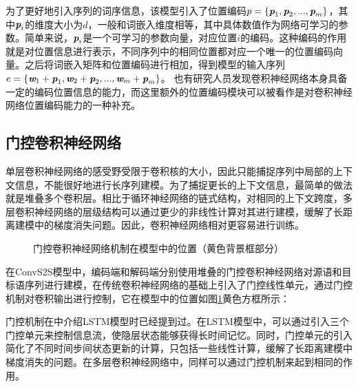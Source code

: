 \parinterval 为了更好地引入序列的词序信息，该模型引入了位置编码${p}=\{\textbf{\em p}_1,\textbf{\em p}_2,...,\textbf{\em p}_m\}$，其中$\textbf{\em p}_i$的维度大小为$d$，一般和词嵌入维度相等，其中具体数值作为网络可学习的参数。简单来说，$\textbf{\em p}_i$是一个可学习的参数向量，对应位置$i$的编码。这种编码的作用就是对位置信息进行表示，不同序列中的相同位置都对应一个唯一的位置编码向量。之后将词嵌入矩阵和位置编码进行相加，得到模型的输入序列${e}=\{\textbf{\em w}_1+\textbf{\em p}_1,\textbf{\em w}_2+\textbf{\em p}_2,...,\textbf{\em w}_m+\textbf{\em p}_m\}$。 也有研究人员发现卷积神经网络本身具备一定的编码位置信息的能力，而这里额外的位置编码模块可以被看作是对卷积神经网络位置编码能力的一种补充。


\subsection{门控卷积神经网络}

\parinterval 单层卷积神经网络的感受野受限于卷积核的大小，因此只能捕捉序列中局部的上下文信息，不能很好地进行长序列建模。为了捕捉更长的上下文信息，最简单的做法就是堆叠多个卷积层。相比于循环神经网络的链式结构，对相同的上下文跨度，多层卷积神经网络的层级结构可以通过更少的非线性计算对其进行建模，缓解了长距离建模中的梯度消失问题。因此，卷积神经网络相对更容易进行训练。

\begin{figure}[htp]
\centering

\caption{门控卷积神经网络机制在模型中的位置（黄色背景框部分）}
\label{fig:11-13}
\end{figure}

\parinterval 在ConvS2S模型中，编码端和解码端分别使用堆叠的门控卷积神经网络对源语和目标语序列进行建模，在传统卷积神经网络的基础上引入了门控线性单元，通过门控机制对卷积输出进行控制，它在模型中的位置如图\ref{fig:11-13}黄色方框所示：

\parinterval 门控机制在{\chapterten}中介绍LSTM模型时已经提到过。在LSTM模型中，可以通过引入三个门控单元来控制信息流，使隐层状态能够获得长时间记忆。同时，门控单元的引入简化了不同时间步间状态更新的计算，只包括一些线性计算，缓解了长距离建模中梯度消失的问题。在多层卷积神经网络中，同样可以通过门控机制来起到相同的作用。

